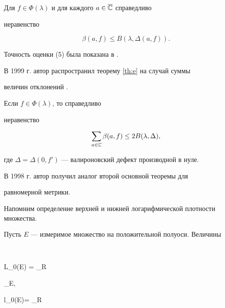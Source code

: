  


\begin{atheorem} \label{th:e}


Для $f\in \Phi(\lambda)$ и для каждого $a\in \overline{\Bbb C}$ справедливо 


неравенство


\begin{equation}


\beta (a,f)\le B(\lambda, \Delta(a,f)).


\end{equation}


\end{atheorem}





Точность оценки (5) была показана в \cite{9}.


В 1999 г. автор распространил теорему \ref{th:e} на случай суммы


величин отклонений \cite{10}.   





\begin{atheorem} \label{th:f}


Если $f\in \Phi(\lambda)$, то справедливо


неравенство


$$


\sum\limits_{a\in{\Bbb C}}\beta (a,f)\le 2B(\lambda,\Delta),


$$


где $\Delta=\Delta(0,f')$ --- валироновский дефект производной в нуле.


\end{atheorem}





В 1998 г. автор \cite{11} получил аналог второй основной теоремы для


равномерной метрики.


Напомним определение верхней и нижней логарифмической плотности множества.


Пусть $E$ --- измеримое множество на положительной полуоси. Величины


$$


{\cal L}_0(E) = \limsup\limits_{R \to \infty}


\int\limits_{E\cap [1,R]},\quad


l_0(E)= \liminf\limits_{R \to \infty}


